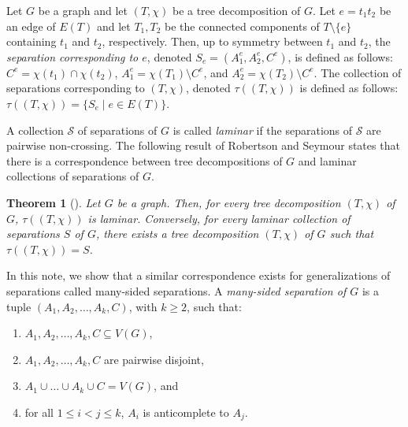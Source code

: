\documentclass[12pt]{amsart}
\renewcommand{\S}{\mathcal{S}}
\newtheorem{theorem}{Theorem}
\begin{document}
Let $G$ be a graph and let $(T, \chi)$ be a tree decomposition of $G$. Let $e = t_1t_2$ be an edge of $E(T)$ and let $T_1, T_2$ be the connected components of $T \setminus \{e\}$ containing $t_1$ and $t_2$, respectively. Then, up to symmetry between $t_1$ and $t_2$, the {\em separation corresponding to $e$}, denoted $S_e = (A_1^e, A_2^e, C^e)$, is defined as follows: $C^e = \chi(t_1) \cap \chi(t_2)$, $A_1^e = \chi(T_1) \setminus C^e$, and $A_2^e = \chi(T_2) \setminus C^e$. The collection of separations corresponding to $(T, \chi)$, denoted $\tau((T, \chi))$ is defined as follows: $\tau((T, \chi)) =\{S_e \mid e \in E(T)\}$. 

A collection $\S$ of separations of $G$ is called {\em laminar} if the separations of $\S$ are pairwise non-crossing. The following result of Robertson and Seymour states that there is a correspondence between tree decompositions of $G$ and laminar collections of separations of $G$. 

\begin{theorem}[\cite{GMX}]
\label{thm:RS}
Let $G$ be a graph. Then, for every tree decomposition $(T, \chi)$ of $G$, $\tau((T, \chi))$ is laminar. Conversely, for every laminar collection of separations $S$ of $G$, there exists a tree decomposition $(T, \chi)$ of $G$ such that $\tau((T, \chi)) = S$.  
\end{theorem}

In this note, we show that a similar correspondence exists for generalizations of separations called many-sided separations. 
A {\em many-sided separation of $G$} is a tuple $(A_1, A_2, \hdots, A_k, C)$, with $k \geq 2$, such that: 

\begin{enumerate}[\hspace{1.5em} (i)]
    \item $A_1, A_2, \hdots, A_k, C \subseteq V(G)$,
    \item $A_1, A_2, \hdots, A_k, C$ are pairwise disjoint, 
    \item $A_1 \cup \hdots \cup A_k \cup C = V(G)$, and
    \item for all $1 \leq i < j \leq k$, $A_i$ is anticomplete to $A_j$. 
\end{enumerate}
\end{document}
